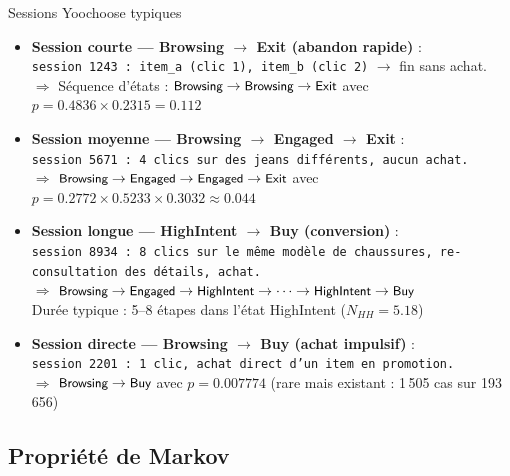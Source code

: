 \documentclass[11pt,a4paper]{article}
\newcommand{\st}[1]{\textsf{\small#1}}
\begin{document}
\begin{exbox}{Sessions Yoochoose typiques}
\begin{itemize}[leftmargin=1.5em,itemsep=4pt,topsep=3pt]

  \item \textbf{Session courte --- Browsing $\to$ Exit (abandon rapide)} :\\
    \texttt{session 1243 : item\_a (clic 1), item\_b (clic 2)} $\to$ fin
    sans achat.\\
    $\Rightarrow$ Séquence d'états : $\st{Browsing} \to \st{Browsing}
    \to \st{Exit}$ avec $p = 0.4836 \times 0.2315 = 0.112$

  \item \textbf{Session moyenne --- Browsing $\to$ Engaged $\to$ Exit} :\\
    \texttt{session 5671 : 4 clics sur des jeans différents, aucun achat.}\\
    $\Rightarrow$ $\st{Browsing} \to \st{Engaged} \to \st{Engaged}
    \to \st{Exit}$ avec $p = 0.2772 \times 0.5233 \times 0.3032 \approx 0.044$

  \item \textbf{Session longue --- HighIntent $\to$ Buy (conversion)} :\\
    \texttt{session 8934 : 8 clics sur le même modèle de chaussures,
    re-consultation des détails, achat.}\\
    $\Rightarrow$ $\st{Browsing} \to \st{Engaged} \to \st{HighIntent}
    \to \cdots \to \st{HighIntent} \to \st{Buy}$\\
    Durée typique : 5--8 étapes dans l'état HighIntent ($N_{HH} = 5.18$)

  \item \textbf{Session directe --- Browsing $\to$ Buy (achat impulsif)} :\\
    \texttt{session 2201 : 1 clic, achat direct d'un item en promotion.}\\
    $\Rightarrow$ $\st{Browsing} \to \st{Buy}$ avec $p = 0.007774$
    (rare mais existant : 1\,505 cas sur 193\,656)

\end{itemize}
\end{exbox}

\subsection{Propriété de Markov}
\end{document}
